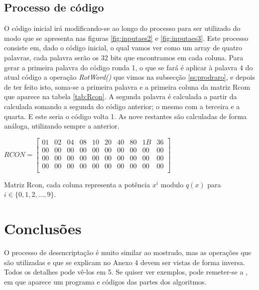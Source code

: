 \subsection{Processo de código}
O código inicial irá modificando-se ao longo do processo para ser utilizado do modo que se apresenta nas figuras \ref{fig:inputaes2} e \ref{fig:inputaes3}. Este processo consiste em, dado o código inicial, o qual vamos ver como um array de quatro palavras, cada palavra serão os 32 bits que encontramos em cada coluna. Para gerar a primeira palavra do código ronda 1, o que se fará é aplicar à palavra 4 do atual código a operação {\sl RotWord()} que vimos na subsecção  \ref{ss:prodraro}, e depois de ter feito isto,  soma-se a primeira palavra e a primeira coluna da matriz Rcom que aparece na tabela \ref{tab:Rcon}. A segunda palavra é calculada a partir da calculada somando a segunda do código anterior; o mesmo com a terceira e a quarta. E este seria o código volta 1. As nove restantes são calculadas de forma análoga, utilizando sempre a anterior.

\begin{table}[ht!]
\begin{center}
$RCON=$\tiny{$\left[
\begin{array}{cccccccccc}
 01 & 02 & 04 & 08 & 10 & 20 & 40 & 80 & 1B & 36\\
 00 & 00 & 00 & 00 & 00 & 00 & 00 & 00 & 00 & 00\\
 00 & 00 & 00 & 00 & 00 & 00 & 00 & 00 & 00 & 00\\
 00 & 00 & 00 & 00 & 00 & 00 & 00 & 00 & 00 & 00\\
\end{array}\right]$}
\end{center}\caption{Matriz Rcon, cada coluna representa a potência $x^i$ modulo $q(x)$ para $i\in\{0,1,2,\dots, 9\}$.}\label{tab:Rcon}
\end{table}


\section{Conclusões}

O processo de desencriptação é muito similar ao mostrado, mas as operações que são utilizadas e que se explicam no Anexo 4 devem ser vistas de forma inversa. Todos os detalhes pode vê-los em 5. Se quiser ver exemplos, pode remeter-se a  \cite{Federal}, em que aparece um programa e códigos das partes dos algoritmos.

\newpage

